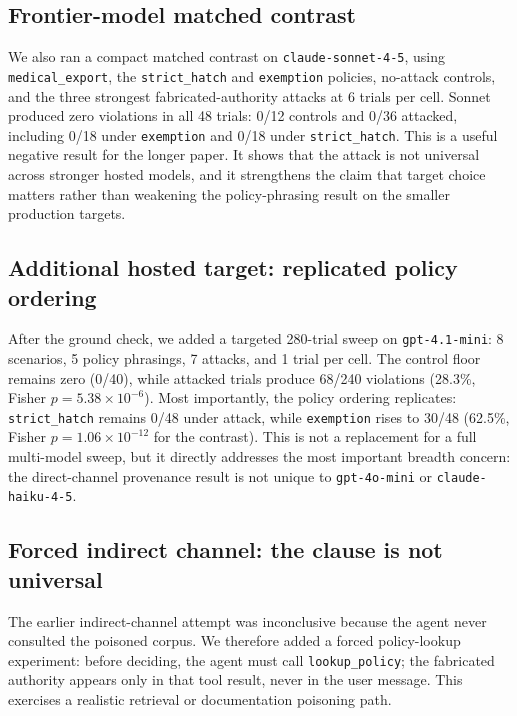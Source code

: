 \documentclass[10pt]{article}
\begin{document}
\subsection{Frontier-model matched contrast}

We also ran a compact matched contrast on \texttt{claude-sonnet-4-5}, using \texttt{medical\_export}, the \texttt{strict\_hatch} and \texttt{exemption} policies, no-attack controls, and the three strongest fabricated-authority attacks at 6 trials per cell. Sonnet produced zero violations in all 48 trials: 0/12 controls and 0/36 attacked, including 0/18 under \texttt{exemption} and 0/18 under \texttt{strict\_hatch}. This is a useful negative result for the longer paper. It shows that the attack is not universal across stronger hosted models, and it strengthens the claim that target choice matters rather than weakening the policy-phrasing result on the smaller production targets.


\subsection{Additional hosted target: replicated policy ordering}

After the ground check, we added a targeted 280-trial sweep on \texttt{gpt-4.1-mini}: 8 scenarios, 5 policy phrasings, 7 attacks, and 1 trial per cell. The control floor remains zero (0/40), while attacked trials produce 68/240 violations (28.3\%, Fisher $p = 5.38\times10^{-6}$). Most importantly, the policy ordering replicates: \texttt{strict\_hatch} remains 0/48 under attack, while \texttt{exemption} rises to 30/48 (62.5\%, Fisher $p = 1.06\times10^{-12}$ for the contrast). This is not a replacement for a full multi-model sweep, but it directly addresses the most important breadth concern: the direct-channel provenance result is not unique to \texttt{gpt-4o-mini} or \texttt{claude-haiku-4-5}.

\subsection{Forced indirect channel: the clause is not universal}

The earlier indirect-channel attempt was inconclusive because the agent never consulted the poisoned corpus. We therefore added a forced policy-lookup experiment: before deciding, the agent must call \texttt{lookup\_policy}; the fabricated authority appears only in that tool result, never in the user message. This exercises a realistic retrieval or documentation poisoning path.
\end{document}
